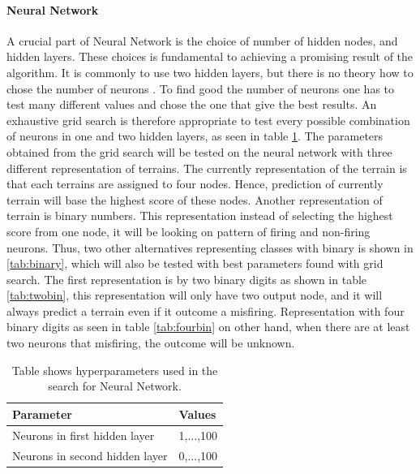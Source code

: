 \documentclass[USenglish]{ifimaster}  %
\begin{document}
\paragraph{Neural Network}
A crucial part of Neural Network is the choice of number of hidden nodes, and hidden layers. These choices is fundamental to achieving a promising result of the algorithm. It is commonly to use two hidden layers, but there is no theory how to chose the number of neurons \cite{Marsland:2009:MLA:1571643}. To find good the number of neurons one has to test many different values and chose the one that give the best results. An exhaustive grid search is therefore appropriate to test every possible combination of neurons in one and two hidden layers, as seen in table \ref{tab:hypnn}. The parameters obtained from the grid search will be tested on the neural network with three different representation of terrains. The currently representation of the terrain is that each terrains are assigned to four nodes. Hence, prediction of currently terrain will base the highest score of these nodes. Another representation of terrain is binary numbers. This representation instead of selecting the highest score from one node, it will be looking on pattern of firing and non-firing neurons. Thus, two other alternatives representing classes with binary is shown in \ref{tab:binary}, which will also be tested with best parameters found with grid search. The first representation is by two binary digits as shown in table \ref{tab:twobin}, this representation will only have two output node, and it will always predict a terrain even if it outcome a misfiring. Representation with four binary digits as seen in table \ref{tab:fourbin} on other hand, when there are at least two neurons that misfiring, the outcome will be unknown.


\begin{table}[h]
	\centering
	\begin{tabular}{@{}ll@{}}
		\toprule
		\textbf{Parameter}             & \textbf{Values} \\ \midrule
		Neurons in first hidden layer  & 1,...,100       \\
		Neurons in second hidden layer & 0,...,100       \\ \bottomrule
	\end{tabular}
	\caption{Table shows hyperparameters used in the search for Neural Network.}
	\label{tab:hypnn}
\end{table}
\FloatBarrier
\end{document}
